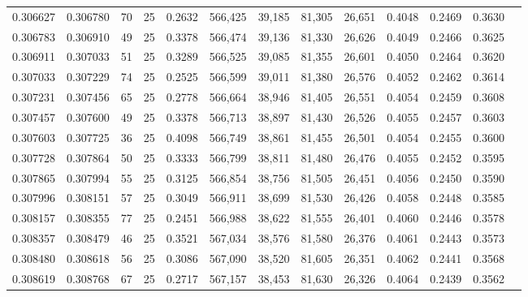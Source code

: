 \begin{tabular}{rrrrrrrrrrrrr}
0.306627 & 0.306780 &    70 &  25 &                                     0.2632 & 566,425 &  39,185 &  81,305 &  26,651 & 0.4048 & 0.2469 & 0.3630 \\
0.306783 & 0.306910 &    49 &  25 &                                     0.3378 & 566,474 &  39,136 &  81,330 &  26,626 & 0.4049 & 0.2466 & 0.3625 \\
0.306911 & 0.307033 &    51 &  25 &                                     0.3289 & 566,525 &  39,085 &  81,355 &  26,601 & 0.4050 & 0.2464 & 0.3620 \\
0.307033 & 0.307229 &    74 &  25 &                                     0.2525 & 566,599 &  39,011 &  81,380 &  26,576 & 0.4052 & 0.2462 & 0.3614 \\
0.307231 & 0.307456 &    65 &  25 &                                     0.2778 & 566,664 &  38,946 &  81,405 &  26,551 & 0.4054 & 0.2459 & 0.3608 \\
0.307457 & 0.307600 &    49 &  25 &                                     0.3378 & 566,713 &  38,897 &  81,430 &  26,526 & 0.4055 & 0.2457 & 0.3603 \\
0.307603 & 0.307725 &    36 &  25 &                                     0.4098 & 566,749 &  38,861 &  81,455 &  26,501 & 0.4054 & 0.2455 & 0.3600 \\
0.307728 & 0.307864 &    50 &  25 &                                     0.3333 & 566,799 &  38,811 &  81,480 &  26,476 & 0.4055 & 0.2452 & 0.3595 \\
0.307865 & 0.307994 &    55 &  25 &                                     0.3125 & 566,854 &  38,756 &  81,505 &  26,451 & 0.4056 & 0.2450 & 0.3590 \\
0.307996 & 0.308151 &    57 &  25 &                                     0.3049 & 566,911 &  38,699 &  81,530 &  26,426 & 0.4058 & 0.2448 & 0.3585 \\
0.308157 & 0.308355 &    77 &  25 &                                     0.2451 & 566,988 &  38,622 &  81,555 &  26,401 & 0.4060 & 0.2446 & 0.3578 \\
0.308357 & 0.308479 &    46 &  25 &                                     0.3521 & 567,034 &  38,576 &  81,580 &  26,376 & 0.4061 & 0.2443 & 0.3573 \\
0.308480 & 0.308618 &    56 &  25 &                                     0.3086 & 567,090 &  38,520 &  81,605 &  26,351 & 0.4062 & 0.2441 & 0.3568 \\
0.308619 & 0.308768 &    67 &  25 &                                     0.2717 & 567,157 &  38,453 &  81,630 &  26,326 & 0.4064 & 0.2439 & 0.3562 \\

\end{tabular}

